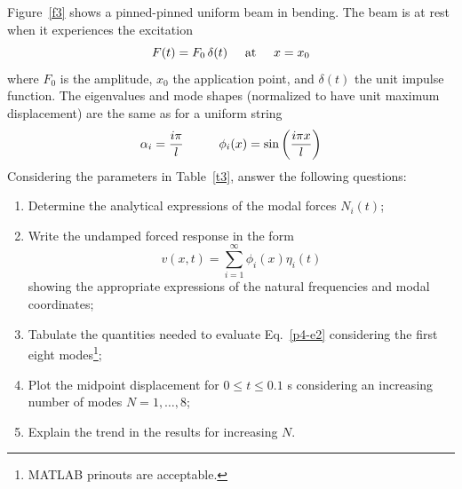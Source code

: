 \documentclass[11pt,a4paper]{article}
\begin{document}
%
Figure~\ref{f3} shows a pinned-pinned uniform beam in bending. The beam is at rest when it experiences the excitation
%
\begin{equation} \label{p4-e1}
	F(t) = F_0 \, \delta(t) \hspace{5mm} \mathrm{at} \hspace{5mm} x = x_0
\end{equation}
%
where $F_0$ is the amplitude, $x_0$ the application point, and $\delta(t)$ the unit impulse function. The eigenvalues and mode shapes (normalized to have unit maximum displacement) are the same as for a uniform string
%
\begin{equation} \label{p4-e2}
	\alpha_i = \frac{i\pi}{l} \hspace{10mm} 
	\phi_i(x) = \sin\left(\frac{i\pi x}{l}\right)
\end{equation}
%
Considering the parameters in Table~\ref{t3}, answer the following questions:
%
\begin{enumerate}
	\item Determine the analytical expressions of the modal forces $N_i(t)$;
	\item Write the undamped forced response in the form
	\begin{equation} \label{p4-e3}
		v(x,t) = \sum_{i=1}^{\infty} \phi_i(x) \eta_i(t)
	\end{equation}
	showing the appropriate expressions of the natural frequencies and modal coordinates;
	\item Tabulate the quantities needed to evaluate Eq.~\eqref{p4-e2} considering the first eight modes\footnote{MATLAB prinouts are acceptable.};
	\item Plot the midpoint displacement for $0 \le t \le 0.1$ s considering an increasing number of modes $N = 1, \dots, 8$;
	\item Explain the trend in the results for increasing $N$. 
\end{enumerate}
\end{document}
